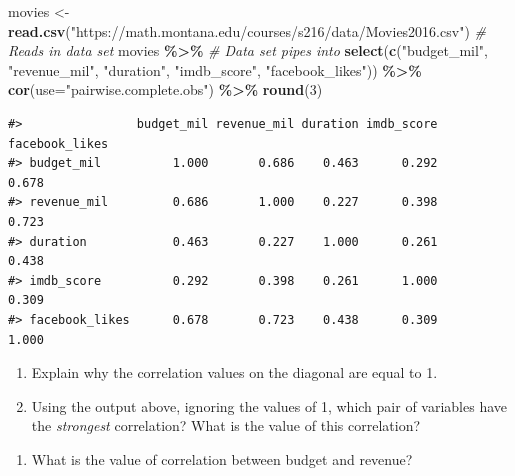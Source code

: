 \documentclass[
]{report}
\newenvironment{Shaded}{\begin{snugshade}}{\end{snugshade}}
\newcommand{\AttributeTok}[1]{\textcolor[rgb]{0.13,0.29,0.53}{#1}}
\newcommand{\CommentTok}[1]{\textcolor[rgb]{0.56,0.35,0.01}{\textit{#1}}}
\newcommand{\DecValTok}[1]{\textcolor[rgb]{0.00,0.00,0.81}{#1}}
\newcommand{\FunctionTok}[1]{\textcolor[rgb]{0.13,0.29,0.53}{\textbf{#1}}}
\newcommand{\NormalTok}[1]{#1}
\newcommand{\OtherTok}[1]{\textcolor[rgb]{0.56,0.35,0.01}{#1}}
\newcommand{\SpecialCharTok}[1]{\textcolor[rgb]{0.81,0.36,0.00}{\textbf{#1}}}
\newcommand{\StringTok}[1]{\textcolor[rgb]{0.31,0.60,0.02}{#1}}
\providecommand{\tightlist}{%
  \setlength{\itemsep}{0pt}\setlength{\parskip}{0pt}}
\begin{document}
\begin{Shaded}
\begin{Highlighting}[]
\NormalTok{movies }\OtherTok{\textless{}{-}} \FunctionTok{read.csv}\NormalTok{(}\StringTok{"https://math.montana.edu/courses/s216/data/Movies2016.csv"}\NormalTok{) }\CommentTok{\# Reads in data set}
\NormalTok{movies }\SpecialCharTok{\%\textgreater{}\%}  \CommentTok{\# Data set pipes into}
  \FunctionTok{select}\NormalTok{(}\FunctionTok{c}\NormalTok{(}\StringTok{"budget\_mil"}\NormalTok{, }\StringTok{"revenue\_mil"}\NormalTok{, }
           \StringTok{"duration"}\NormalTok{, }\StringTok{"imdb\_score"}\NormalTok{, }
           \StringTok{"facebook\_likes"}\NormalTok{)) }\SpecialCharTok{\%\textgreater{}\%}
  \FunctionTok{cor}\NormalTok{(}\AttributeTok{use=}\StringTok{"pairwise.complete.obs"}\NormalTok{) }\SpecialCharTok{\%\textgreater{}\%}
  \FunctionTok{round}\NormalTok{(}\DecValTok{3}\NormalTok{)}
\end{Highlighting}
\end{Shaded}

\begin{verbatim}
#>                budget_mil revenue_mil duration imdb_score facebook_likes
#> budget_mil          1.000       0.686    0.463      0.292          0.678
#> revenue_mil         0.686       1.000    0.227      0.398          0.723
#> duration            0.463       0.227    1.000      0.261          0.438
#> imdb_score          0.292       0.398    0.261      1.000          0.309
#> facebook_likes      0.678       0.723    0.438      0.309          1.000
\end{verbatim}

\begin{enumerate}
\def\labelenumi{\arabic{enumi}.}
\item
  Explain why the correlation values on the diagonal are equal to 1.
  \vspace{0.8in}
\item
  Using the output above, ignoring the values of 1, which pair of variables have the \emph{strongest} correlation? What is the value of this correlation?
\end{enumerate}

\vspace{0.5in}

\begin{enumerate}
\def\labelenumi{\arabic{enumi}.}
\setcounter{enumi}{2}
\tightlist
\item
  What is the value of correlation between budget and revenue?
\end{enumerate}
\end{document}
